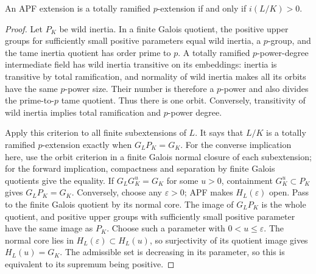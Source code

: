 \begin{proposition}
\label{fw:apf-wild-ramification}
\notready
An APF extension is a totally ramified $p$-extension if and only if
$i(L/K)>0$.
\end{proposition}
\begin{proof}
Let $P_K$ be wild inertia. In a finite Galois quotient, the positive
upper groups for sufficiently small positive parameters equal wild
inertia, a $p$-group, and the tame inertia quotient has order prime to
$p$. A totally ramified $p$-power-degree intermediate field has wild
inertia transitive on its embeddings: inertia is transitive by total
ramification, and normality of wild inertia makes all its orbits have
the same $p$-power size. Their number is therefore a $p$-power and also
divides the prime-to-$p$ tame quotient. Thus there is one orbit. Conversely, transitivity of wild
inertia implies total ramification and $p$-power degree.

Apply this criterion to all finite subextensions of $L$. It says that
$L/K$ is a totally ramified $p$-extension exactly when $G_LP_K=G_K$.
For the converse implication here, use the orbit criterion in a finite
Galois normal closure of each subextension; for the forward implication,
compactness and separation by finite Galois quotients give the equality.
If $G_LG_K^u=G_K$ for some $u>0$, containment $G_K^u\subset P_K$ gives
$G_LP_K=G_K$. Conversely, choose any $\varepsilon>0$; APF makes
$H_L(\varepsilon)$ open. Pass to the finite Galois quotient by its
normal core. The image of $G_LP_K$ is the whole quotient, and positive
upper groups with sufficiently small positive parameter have the same
image as $P_K$. Choose such a parameter with $0<u\leq\varepsilon$.
The normal core lies in $H_L(\varepsilon)\subset H_L(u)$, so surjectivity
of its quotient image gives $H_L(u)=G_K$. The admissible set
is decreasing in its parameter, so this is equivalent to its supremum
being positive.
\end{proof}

